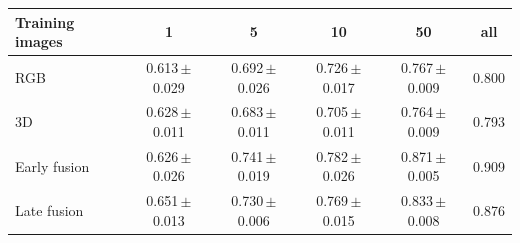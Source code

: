 \begin{tabular}{lccccc}
\toprule
Training images & 1 & 5 & 10 & 50 & all \\
\midrule
RGB & 0.613\,{\scriptsize$\pm$0.029} & 0.692\,{\scriptsize$\pm$0.026} & 0.726\,{\scriptsize$\pm$0.017} & 0.767\,{\scriptsize$\pm$0.009} & 0.800 \\
3D & 0.628\,{\scriptsize$\pm$0.011} & 0.683\,{\scriptsize$\pm$0.011} & 0.705\,{\scriptsize$\pm$0.011} & 0.764\,{\scriptsize$\pm$0.009} & 0.793 \\
Early fusion & 0.626\,{\scriptsize$\pm$0.026} & 0.741\,{\scriptsize$\pm$0.019} & 0.782\,{\scriptsize$\pm$0.026} & 0.871\,{\scriptsize$\pm$0.005} & 0.909 \\
Late fusion & 0.651\,{\scriptsize$\pm$0.013} & 0.730\,{\scriptsize$\pm$0.006} & 0.769\,{\scriptsize$\pm$0.015} & 0.833\,{\scriptsize$\pm$0.008} & 0.876 \\
\bottomrule
\end{tabular}

